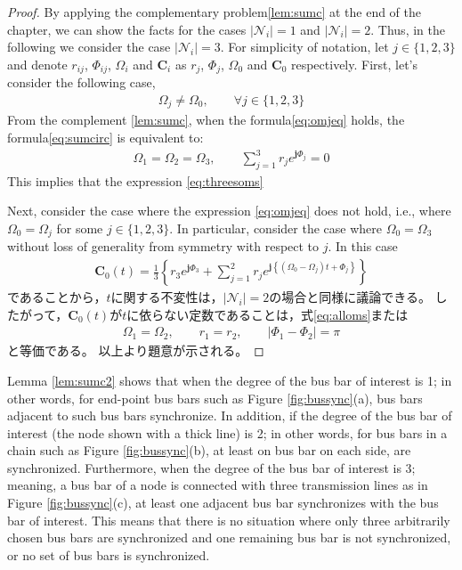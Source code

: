 \documentclass[graybox, envcountchap]{svmult}
\begin{document}
\begin{proof}
By applying the complementary problem\ref{lem:sumc} at the end of the chapter, we can show the facts for the cases $|\mathcal{N}_i|=1$ and $|\mathcal{N}_i|=2$.
Thus, in the following we consider the case $|\mathcal{N}_i|=3$.
For simplicity of notation, let $j \in\{1,2,3\}$ and denote $r_{ij}$, $\Phi_{ij}$, $\Omega_i$ and $\bm{C}_i$ as $r_{j}$, $\Phi_{j}$, $\Omega_0$ and $\bm{C}_0$ respectively.
First, let's consider the following case,
\begin{align}\label{eq:omjeq}
\Omega_j \neq \Omega_0
,\qquad \forall j \in \{1,2,3\}
\end{align}
From the complement \ref{lem:sumc}, when the formula\ref{eq:omjeq} holds, the formula\ref{eq:sumcirc} is equivalent to:
\begin{align*}
\Omega_1 = \Omega_2 = \Omega_3,\qquad
\sum_{j=1}^3 
r_j e^{\bm{j} \Phi_j}=0
\end{align*}
This implies that the expression \ref{eq:threesoms}

Next, consider the case where the expression \ref{eq:omjeq} does not hold, i.e., where $\Omega_0=\Omega_j$ for some $j\in\{1,2,3\}$.
In particular, consider the case where $\Omega_0=\Omega_3$ without loss of generality from symmetry with respect to $j$.
In this case
\begin{align*}
\bm{C}_0 (t) = \frac{1}{3} \left\{
r_3 e^{\bm{j} \Phi_3}
+
\sum_{j=1}^2
r_{j}
e^{\bm{j} 
\left\{
(\Omega_0 - \Omega_j)t + 
\Phi_{j}
\right\} }
\right\}
\end{align*}
であることから，$t$に関する不変性は，$|\mathcal{N}_i|=2$の場合と同様に議論できる。
したがって，$\bm{C}_0 (t)$が$t$に依らない定数であることは，式\ref{eq:alloms}または
\begin{align*}
\Omega_{1} = \Omega_{2}
,\qquad
r_{1} = r_{2}
,\qquad
|\Phi_{1}-\Phi_{2}| = \pi
\end{align*}
と等価である。
以上より題意が示される。
\end{proof}

Lemma \ref{lem:sumc2} shows that when the degree of the bus bar of interest is 1; in other words, for end-point bus bars such as Figure \ref{fig:bussync}(a), bus bars adjacent to such bus bars synchronize.
In addition, if the degree of the bus bar of interest (the node shown with a thick line) is 2; in other words, for bus bars in a chain such as Figure \ref{fig:bussync}(b), at least on bus bar on each side, are synchronized.
Furthermore, when the degree of the bus bar of interest is 3; meaning, a bus bar of a node is connected with three transmission lines as in Figure \ref{fig:bussync}(c), at least one adjacent bus bar synchronizes with the bus bar of interest.
This means that there is no situation where only three arbitrarily chosen bus bars are synchronized and one remaining bus bar is not synchronized, or no set of bus bars is synchronized.
\end{document}
